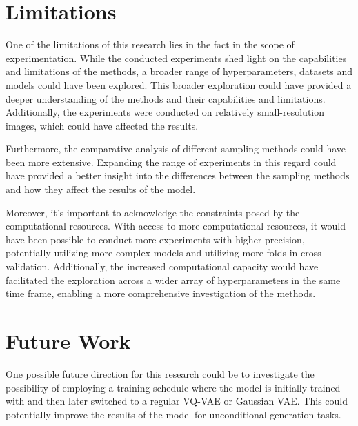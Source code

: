 
\section{Limitations}

One of the limitations of this research lies in the fact in the scope of experimentation. While the conducted experiments shed light on the capabilities and limitations of the methods, a broader range of hyperparameters, datasets and models could have been explored. This broader exploration could have provided a deeper understanding of the methods and their capabilities and limitations. Additionally, the experiments were conducted on relatively small-resolution images, which could have affected the results.

Furthermore, the comparative analysis of different sampling methods could have been more extensive. Expanding the range of experiments in this regard could have provided a better insight into the differences between the sampling methods and how they affect the results of the model.

Moreover, it's important to acknowledge the constraints posed by the computational resources. With access to more computational resources, it would have been possible to conduct more experiments with higher precision, potentially utilizing more complex models and utilizing more folds in cross-validation. Additionally, the increased computational capacity would have facilitated the exploration across a wider array of hyperparameters in the same time frame, enabling a more comprehensive investigation of the methods.

\section{Future Work}

One possible future direction for this research could be to investigate the possibility of employing a training schedule where the model is initially trained with  and then later switched to a regular VQ-VAE or Gaussian VAE. This could potentially improve the results of the model for unconditional generation tasks.

